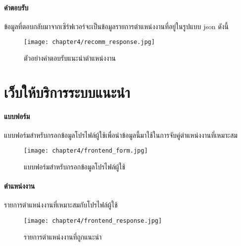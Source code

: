 \paragraph*{คำตอบรับ}
  ข้อมูลที่ตอบกลับมาจากเซิร์ฟเวอร์จะเป็นข้อมูลรายการตำแหน่งงานที่อยู่ในรูปแบบ json ดังนี้
  \begin{figure}[!h]
    \centering
    \texttt{[image: chapter4/recomm\_response.jpg]}  
    \caption{ตัวอย่างคำตอบรับแนะนำตำแหน่งงาน}
    \label{Fig:recomm_response}
  \end{figure}
  \clearpage

\section{เว็บให้บริการระบบแนะนำ}
  \paragraph*{แบบฟอร์ม} แบบฟอร์มสำหรับกรอกข้อมูลโปรไฟล์ผู้ใช้เพื่อนำข้อมูลนี้มาใช้ในการจับคู่ตำแหน่งงานที่เหมาะสม
  \begin{figure}[!h]
    \centering
    \texttt{[image: chapter4/frontend\_form.jpg]}  
    \caption{แบบฟอร์มสำหรับกรอกข้อมูลโปรไฟล์ผู้ใช้}
    \label{Fig:frontend_form}
  \end{figure}

  \paragraph*{ตำแหน่งงาน} รายการตำแหน่งงานที่เหมาะสมกับโปรไฟล์ผู้ใช้
  \begin{figure}[!h]
    \centering
    \texttt{[image: chapter4/frontend\_response.jpg]}  
    \caption{รายการตำแหน่งงานที่ถูกแนะนำ}
    \label{Fig:frontend_form}
  \end{figure}

